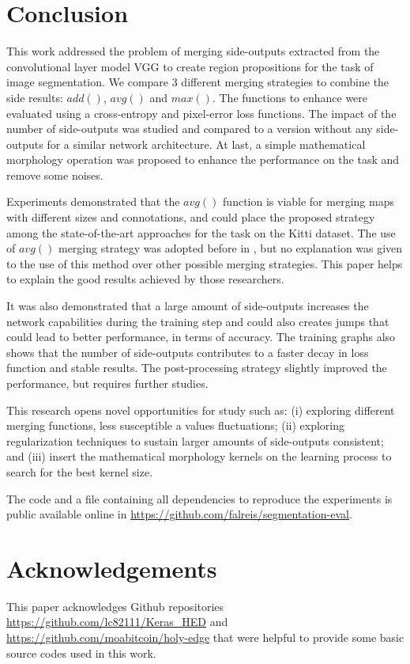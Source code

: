 \section{Conclusion}
\label{sec:conclusion}

This work addressed the problem of merging side-outputs extracted from the convolutional layer model VGG to create region propositions for the task of image segmentation. We compare 3 different merging strategies to combine the side results: $add()$, $avg()$ and $max()$. The functions to enhance were evaluated using a cross-entropy and pixel-error loss functions. The impact of the number of side-outputs was studied and compared to a version without any side-outputs for a similar network architecture. At last, a simple mathematical morphology operation was proposed to  enhance the performance on the task and remove some noises. 

Experiments demonstrated that the $avg()$ function is viable for merging maps with different sizes and connotations, and could place the proposed strategy among the state-of-the-art approaches for the task on the Kitti dataset. The use of $avg()$ merging strategy was adopted before in \cite{liu2017}, but no explanation was given to the use of this method over other possible merging strategies. This paper helps to explain the good results achieved by those researchers.

It was also demonstrated that a large amount of side-outputs increases the network capabilities during the training step and could also creates jumps that could lead to better performance, in terms of accuracy. The training graphs also shows that the number of side-outputs contributes to a faster decay in loss function and stable results. The post-processing strategy slightly improved the performance, but requires further studies.

This research opens novel opportunities for study such as: (i) exploring different merging functions, less susceptible a values fluctuations;  (ii) exploring regularization techniques to sustain larger amounts of side-outputs consistent; and (iii) insert the mathematical morphology kernels on the learning process to search for the best kernel size. 
 
The code  and a file containing all dependencies to reproduce the experiments is public available online in \url{https://github.com/falreis/segmentation-eval}. 

\section{Acknowledgements}
\label{sec:acknowledgements}

This paper acknowledges Github repositories \url{https://github.com/lc82111/Keras_HED} and \url{https://github.com/moabitcoin/holy-edge} that were helpful to provide some basic source codes used in this work.
